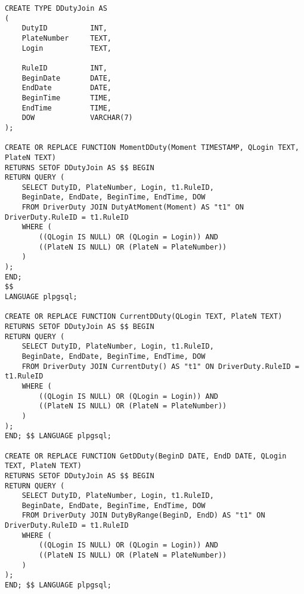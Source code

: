 \begin{lstlisting}[caption = {Релизация функций для таблицы DriverDuty}, label=lst:driver_duty_f]
CREATE TYPE DDutyJoin AS
(
	DutyID 			INT,
	PlateNumber		TEXT,
	Login			TEXT,
	
	RuleID			INT,
	BeginDate		DATE,
	EndDate			DATE,
	BeginTime		TIME,
	EndTime			TIME,
	DOW				VARCHAR(7)
);

CREATE OR REPLACE FUNCTION MomentDDuty(Moment TIMESTAMP, QLogin TEXT, PlateN TEXT)
RETURNS SETOF DDutyJoin AS $$ BEGIN
RETURN QUERY (
	SELECT DutyID, PlateNumber, Login, t1.RuleID, 
	BeginDate, EndDate, BeginTime, EndTime, DOW
	FROM DriverDuty JOIN DutyAtMoment(Moment) AS "t1" ON DriverDuty.RuleID = t1.RuleID
	WHERE (
		((QLogin IS NULL) OR (QLogin = Login)) AND
		((PlateN IS NULL) OR (PlateN = PlateNumber))
	)
);
END;
$$
LANGUAGE plpgsql;

CREATE OR REPLACE FUNCTION CurrentDDuty(QLogin TEXT, PlateN TEXT)
RETURNS SETOF DDutyJoin AS $$ BEGIN
RETURN QUERY (
	SELECT DutyID, PlateNumber, Login, t1.RuleID, 
	BeginDate, EndDate, BeginTime, EndTime, DOW
	FROM DriverDuty JOIN CurrentDuty() AS "t1" ON DriverDuty.RuleID = t1.RuleID
	WHERE (
		((QLogin IS NULL) OR (QLogin = Login)) AND
		((PlateN IS NULL) OR (PlateN = PlateNumber))
	)
);
END; $$ LANGUAGE plpgsql;

CREATE OR REPLACE FUNCTION GetDDuty(BeginD DATE, EndD DATE, QLogin TEXT, PlateN TEXT)
RETURNS SETOF DDutyJoin AS $$ BEGIN
RETURN QUERY (
	SELECT DutyID, PlateNumber, Login, t1.RuleID, 
	BeginDate, EndDate, BeginTime, EndTime, DOW
	FROM DriverDuty JOIN DutyByRange(BeginD, EndD) AS "t1" ON DriverDuty.RuleID = t1.RuleID
	WHERE (
		((QLogin IS NULL) OR (QLogin = Login)) AND
		((PlateN IS NULL) OR (PlateN = PlateNumber))
	)
);
END; $$ LANGUAGE plpgsql;
\end{lstlisting}

